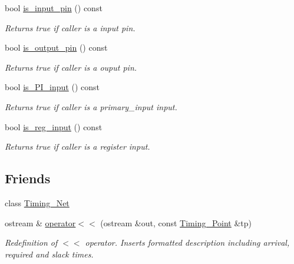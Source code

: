 \begin{DoxyCompactItemize}
bool \hyperlink{classTiming__Analysis_1_1Timing__Point_aebb2497a057619c1cc9206253238f969}{is\-\_\-input\-\_\-pin} () const 
\begin{DoxyCompactList}\small\item\em Returns true if caller is a input pin. \end{DoxyCompactList}\item 
bool \hyperlink{classTiming__Analysis_1_1Timing__Point_a5c8883bd6dae6b49cb5c80e16b612d70}{is\-\_\-output\-\_\-pin} () const 
\begin{DoxyCompactList}\small\item\em Returns true if caller is a ouput pin. \end{DoxyCompactList}\item 
bool \hyperlink{classTiming__Analysis_1_1Timing__Point_a1353ea265660f4bada0367f9a0d4251c}{is\-\_\-\-P\-I\-\_\-input} () const 
\begin{DoxyCompactList}\small\item\em Returns true if caller is a primary\-\_\-input input. \end{DoxyCompactList}\item 
bool \hyperlink{classTiming__Analysis_1_1Timing__Point_aabcd5ebf7151be22c98753d16f26c84c}{is\-\_\-reg\-\_\-input} () const 
\begin{DoxyCompactList}\small\item\em Returns true if caller is a register input. \end{DoxyCompactList}\end{DoxyCompactItemize}
\subsection*{Friends}
\begin{DoxyCompactItemize}
\item 
class \hyperlink{classTiming__Analysis_1_1Timing__Point_a2050314f5969ad9af0efe192b472b67a}{Timing\-\_\-\-Net}
\item 
ostream \& \hyperlink{classTiming__Analysis_1_1Timing__Point_a9ff76c936a6e34e8de6e1335f9d94663}{operator$<$$<$} (ostream \&out, const \hyperlink{classTiming__Analysis_1_1Timing__Point}{Timing\-\_\-\-Point} \&tp)
\begin{DoxyCompactList}\small\item\em Redefinition of $<$$<$ operator. Inserts formatted description including arrival, required and slack times. \end{DoxyCompactList}\end{DoxyCompactItemize}


